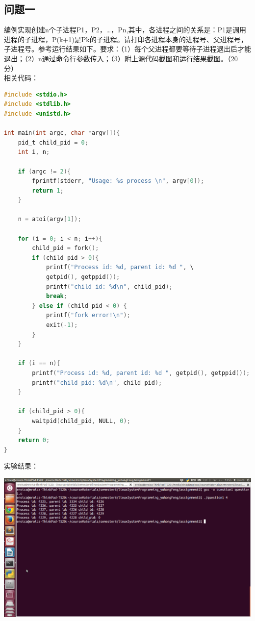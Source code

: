 \documentclass{article}
\begin{document}
\subsection{问题一}
编例实现创建n个子进程P1，P2，…，Pn,其中，各进程之间的关系是：P1是调用进程的子进程，P(k+1)是Pk的子进程。请打印各进程本身的进程号、父进程号，子进程号。参考运行结果如下。要求：（1）每个父进程都要等待子进程退出后才能退出；（2）n通过命令行参数传入；（3）附上源代码截图和运行结果截图。（20分） \\

相关代码：

\begin{lstlisting}[language=C]
#include <stdio.h>
#include <stdlib.h>
#include <unistd.h>

int main(int argc, char *argv[]){
	pid_t child_pid = 0;
	int i, n;

	if (argc != 2){
		fprintf(stderr, "Usage: %s process \n", argv[0]);
		return 1;
	}

	n = atoi(argv[1]);

	for (i = 0; i < n; i++){
		child_pid = fork();
		if (child_pid > 0){
			printf("Process id: %d, parent id: %d ", \
			getpid(), getppid());
			printf("child id: %d\n", child_pid);
			break;
		} else if (child_pid < 0) {
			printf("fork error!\n");
			exit(-1);
		}
	}

	if (i == n){
		printf("Process id: %d, parent id: %d ", getpid(), getppid());
		printf("child_pid: %d\n", child_pid);
	}

	if (child_pid > 0){
		waitpid(child_pid, NULL, 0);
	}
	return 0;
}
\end{lstlisting}

实验结果：
\begin{center}
\includegraphics[width=0.8\columnwidth]{pic_question1} %
\end{center}
\end{document}
